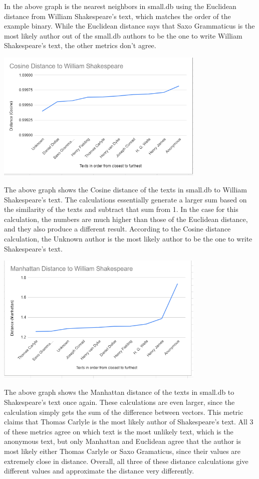 \documentclass[11pt]{article}
\begin{document}
In the above graph is the nearest neighbors in small.db using the Euclidean distance from William Shakespeare's text, which matches the order of the example binary. While the Euclidean distance says that Saxo Grammaticus is the most likely author out of the small.db authors to be the one to write William Shakespeare's text, the other metrics don't agree.

\includegraphics[width = 0.75\textwidth]{Graphs/Cosine.PNG}

The above graph shows the Cosine distance of the texts in small.db to William Shakespeare's text. The calculations essentially generate a larger sum based on the similarity of the texts and subtract that sum from 1. In the case for this calculation, the numbers are much higher than those of the Euclidean distance, and they also produce a different result. According to the Cosine distance calculation, the Unknown author is the most likely author to be the one to write Shakespeare's text.

\includegraphics[width = 0.75\textwidth]{Graphs/Manhattan.PNG}

The above graph shows the Manhattan distance of the texts in small.db to Shakespeare's text once again. These calculations are even larger, since the calculation simply gets the sum of the difference between vectors. This metric claims that Thomas Carlyle is the most likely author of Shakespeare's text. All 3 of these metrics agree on which text is the most unlikely text, which is the anonymous text, but only Manhattan and Euclidean agree that the author is most likely either Thomas Carlyle or Saxo Gramaticus, since their values are extremely close in distance. Overall, all three of these distance calculations give different values and approximate the distance very differently. 
\end{document}
